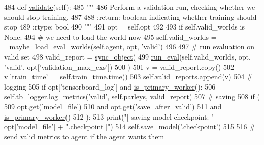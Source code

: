 \begin{DoxyCode}
484     \textcolor{keyword}{def }\hyperlink{namespaceparlai_1_1core_1_1worlds_afc3fad603b7bce41dbdc9cdc04a9c794}{validate}(self):
485         \textcolor{stringliteral}{"""}
486 \textcolor{stringliteral}{        Perform a validation run, checking whether we should stop training.}
487 \textcolor{stringliteral}{}
488 \textcolor{stringliteral}{        :return: boolean indicating whether training should stop}
489 \textcolor{stringliteral}{        :rtype: bool}
490 \textcolor{stringliteral}{        """}
491         opt = self.opt
492 
493         \textcolor{keywordflow}{if} self.valid\_worlds \textcolor{keywordflow}{is} \textcolor{keywordtype}{None}:
494             \textcolor{comment}{# we need to load the world now}
495             self.valid\_worlds = \_maybe\_load\_eval\_worlds(self.agent, opt, \textcolor{stringliteral}{'valid'})
496 
497         \textcolor{comment}{# run evaluation on valid set}
498         valid\_report = \hyperlink{namespaceparlai_1_1utils_1_1distributed_a269d3c7284127d9b287b9b61e9161de6}{sync\_object}(
499             \hyperlink{namespaceparlai_1_1scripts_1_1train__model_a496dfe3bf04da9b55d261b4c8d6229a7}{run\_eval}(self.valid\_worlds, opt, \textcolor{stringliteral}{'valid'}, opt[\textcolor{stringliteral}{'validation\_max\_exs'}])
500         )
501         v = valid\_report.copy()
502         v[\textcolor{stringliteral}{'train\_time'}] = self.train\_time.time()
503         self.valid\_reports.append(v)
504         \textcolor{comment}{# logging}
505         \textcolor{keywordflow}{if} opt[\textcolor{stringliteral}{'tensorboard\_log'}] \textcolor{keywordflow}{and} \hyperlink{namespaceparlai_1_1utils_1_1distributed_a9bb1dac198180590ef8c6b6c6f9fc2c4}{is\_primary\_worker}():
506             self.tb\_logger.log\_metrics(\textcolor{stringliteral}{'valid'}, self.parleys, valid\_report)
507         \textcolor{comment}{# saving}
508         \textcolor{keywordflow}{if} (
509             opt.get(\textcolor{stringliteral}{'model\_file'})
510             \textcolor{keywordflow}{and} opt.get(\textcolor{stringliteral}{'save\_after\_valid'})
511             \textcolor{keywordflow}{and} \hyperlink{namespaceparlai_1_1utils_1_1distributed_a9bb1dac198180590ef8c6b6c6f9fc2c4}{is\_primary\_worker}()
512         ):
513             print(\textcolor{stringliteral}{"[ saving model checkpoint: "} + opt[\textcolor{stringliteral}{'model\_file'}] + \textcolor{stringliteral}{".checkpoint ]"})
514             self.save\_model(\textcolor{stringliteral}{'.checkpoint'})
515 
516         \textcolor{comment}{# send valid metrics to agent if the agent wants them}

\end{DoxyCode}
